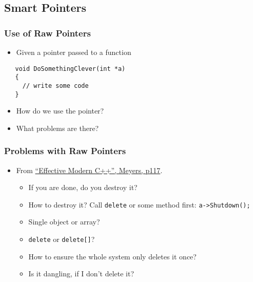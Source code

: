 \subsection{Smart Pointers}\label{smart-pointers}

\subsubsection{Use of Raw Pointers}\label{use-of-raw-pointers}

\begin{itemize}
\itemsep1pt\parskip0pt
\item
  Given a pointer passed to a function
\end{itemize}

\begin{verbatim}
   void DoSomethingClever(int *a) 
   {
     // write some code
   }
\end{verbatim}

\begin{itemize}
\itemsep1pt\parskip0pt
\item
  How do we use the pointer?
\item
  What problems are there?
\end{itemize}

\subsubsection{Problems with Raw
Pointers}\label{problems-with-raw-pointers}

\begin{itemize}
\itemsep1pt\parskip0pt
\item
  From
  \href{https://www.amazon.co.uk/Effective-Modern-Specific-Ways-Improve/dp/1491903996/ref=sr_1_1?ie=UTF8\&qid=1484571499\&sr=8-1\&keywords=Effective+Modern+C\%2B\%2B}{``Effective
  Modern C++'', Meyers, p117}.

  \begin{itemize}
  \itemsep1pt\parskip0pt
  \item
    If you are done, do you destroy it?
  \item
    How to destroy it? Call \texttt{delete} or some method first:
    \texttt{a-\textgreater{}Shutdown();}
  \item
    Single object or array?
  \item
    \texttt{delete} or \texttt{delete{[}{]}}?
  \item
    How to ensure the whole system only deletes it once?
  \item
    Is it dangling, if I don't delete it?
  \end{itemize}
\end{itemize}

